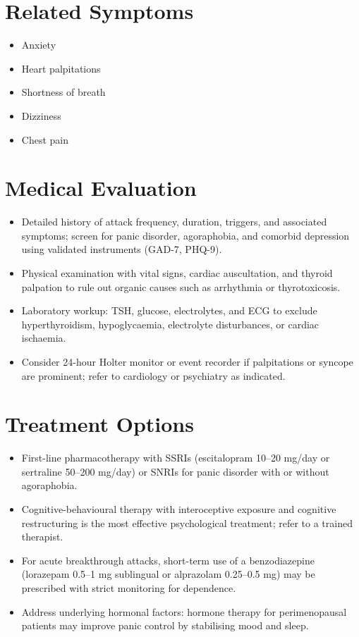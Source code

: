 \section*{Related Symptoms}
\begin{itemize}
  \item Anxiety
  \item Heart palpitations
  \item Shortness of breath
  \item Dizziness
  \item Chest pain
\end{itemize}


\section*{Medical Evaluation}
\begin{itemize}
  \item Detailed history of attack frequency, duration, triggers, and associated symptoms; screen for panic disorder, agoraphobia, and comorbid depression using validated instruments (GAD-7, PHQ-9).
  \item Physical examination with vital signs, cardiac auscultation, and thyroid palpation to rule out organic causes such as arrhythmia or thyrotoxicosis.
  \item Laboratory workup: TSH, glucose, electrolytes, and ECG to exclude hyperthyroidism, hypoglycaemia, electrolyte disturbances, or cardiac ischaemia.
  \item Consider 24-hour Holter monitor or event recorder if palpitations or syncope are prominent; refer to cardiology or psychiatry as indicated.
\end{itemize}

\section*{Treatment Options}
\begin{itemize}
  \item First-line pharmacotherapy with SSRIs (escitalopram 10--20 mg/day or sertraline 50--200 mg/day) or SNRIs for panic disorder with or without agoraphobia.
  \item Cognitive-behavioural therapy with interoceptive exposure and cognitive restructuring is the most effective psychological treatment; refer to a trained therapist.
  \item For acute breakthrough attacks, short-term use of a benzodiazepine (lorazepam 0.5--1 mg sublingual or alprazolam 0.25--0.5 mg) may be prescribed with strict monitoring for dependence.
  \item Address underlying hormonal factors: hormone therapy for perimenopausal patients may improve panic control by stabilising mood and sleep.
\end{itemize}

